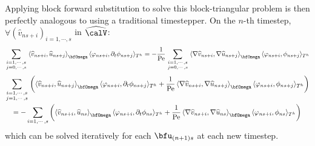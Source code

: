 \begin{example}
        Applying block forward substitution to solve this block-triangular problem is then perfectly analogous to using a traditional timestepper. On the $n$-th timestep, $\forall  \left(\widehat{v}_{ns + i}\right)_{i = 1, \cdots, s}$ in $\widehat{\calV}$:
        \begin{equation}
            \sum_{\begin{smallmatrix}  i = 1, \cdots, s  \\  j = 0, \cdots, s  \end{smallmatrix}}\left\langle\widehat{v}_{ns + i}, \widehat{u}_{ns + j}\right\rangle_{\bfOmega}\langle\varphi_{ns + i}, \partial_{t}\phi_{ns + j}\rangle_{T^{h}}  =  - \frac{1}{\rmPe}\sum_{\begin{smallmatrix}  i = 1, \cdots, s  \\  j = 0, \cdots, s  \end{smallmatrix}}\left\langle\nabla\widehat{v}_{ns + i}, \nabla\widehat{u}_{ns + j}\right\rangle_{\bfOmega}\langle\varphi_{ns + i}, \phi_{ns + j}\rangle_{T^{h}}
        \end{equation}
        \begin{multline}
            \sum_{\begin{smallmatrix}  i = 1, \cdots, s  \\  j = 1, \cdots, s  \end{smallmatrix}}\left(\left\langle\widehat{v}_{ns + i}, \widehat{u}_{ns + j}\right\rangle_{\bfOmega}\langle\varphi_{ns + i}, \partial_{t}\phi_{ns + j}\rangle_{T^{h}} + \frac{1}{\rmPe}\left\langle\nabla\widehat{v}_{ns + i}, \nabla\widehat{u}_{ns + j}\right\rangle_{\bfOmega}\langle\varphi_{ns + i}, \phi_{ns + j}\rangle_{T^{h}}\right)  \\
            =  - \sum_{i = 1, \cdots, s}\left(\left\langle\widehat{v}_{ns + i}, \widehat{u}_{ns}\right\rangle_{\bfOmega}\langle\varphi_{ns + i}, \partial_{t}\phi_{ns}\rangle_{T^{h}} + \frac{1}{\rmPe}\left\langle\nabla\widehat{v}_{ns + i}, \nabla\widehat{u}_{ns}\right\rangle_{\bfOmega}\langle\varphi_{ns + i}, \phi_{ns}\rangle_{T^{h}}\right)
        \end{multline}
        which can be solved iteratively for each $\bfu_{(n + 1)s}$ at each new timestep.


\end{example}
